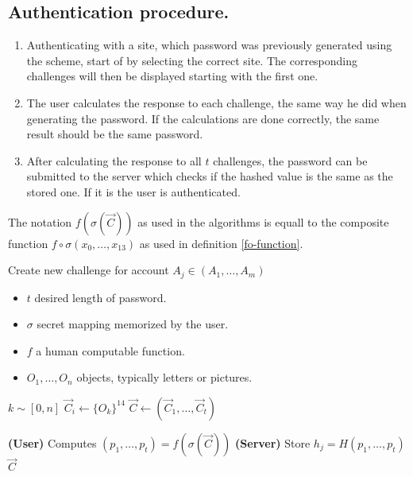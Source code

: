 \subsection{Authentication procedure.}\label{subsec:auth}
\begin{enumerate}
    \item Authenticating with a site, which password was previously generated using the scheme, start of by selecting the correct site. The corresponding challenges will then be displayed starting with the first one.
    \item The user calculates the response to each challenge, the same way he did when generating the password. If the calculations are done correctly, the same result should be the same password.
    \item After calculating the response to all $t$ challenges, the password can be submitted to the server which checks if the hashed value is the same as the stored one. If it is the user is authenticated.
\end{enumerate}

\begin{remark}
    The notation $f(\sigma(\vec C))$ as used in the algorithms is equall to the composite function $f \circ \sigma(x_0,\dots,x_{13})$ as used in definition \ref{fo-function}.

\end{remark}

\begin{algorithm}
    \caption{Create new challenge for account $A_j \in (A_1,\dots, A_m)$}
    \begin{algorithmic}[1]
        \Require
            \Statex \begin{itemize}
                \item $t$ desired length of password.
                \item $\sigma$ secret mapping memorized by the user.
                \item $f$ a human computable function.
                \item $O_1,\dots,O_n$ objects, typically letters or pictures.
            \end{itemize}
            
        
            \State $k \sim [0, n] $
            \State $\vec C_i \leftarrow \{O_k\}^{14} $
        \EndFor
        \Statex
        \State $\vec C \leftarrow (\vec C_1,\dots, \vec C_t) $

        \State \textbf{(User)} Computes $(p_1,\dots,p_t)=f(\sigma(\vec C))$
        \State \textbf{(Server)} Store $h_j = H(p_1,\dots,p_t)$
        \State
        \State \Return $\vec C$
    \end{algorithmic}
    \label{new-challenge-algo}
\end{algorithm}


